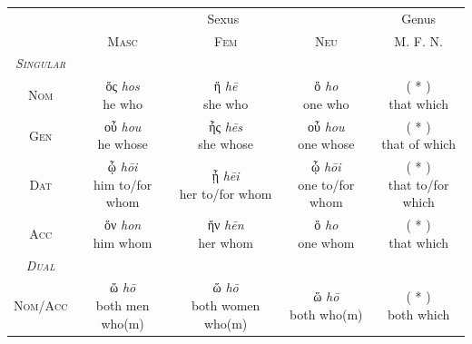 \documentclass[10pt,a4paper,notitlepage]{article}
\newcommand{\tsc}[1]{\textsc{#1}}
\newcommand*{\grc}[1]{\fontspec{Inter}#1\rmfamily}
\newcommand{\trc}[1]{\textit{\fontspec{Tinos}#1}}
\begin{document}
    \begin{table}[H]
        \begin{tabular}{c|ccc|c}
            & \multicolumn{3}{c|}{Sexus} & Genus \\
            & \tsc{Masc} & \tsc{Fem} & \tsc{Neu} & \tsc{M. F. N.} \\
            \hline
            \emph{\tsc{Singular}} & & & & \\
            \tsc{Nom} & \makecell{\grc{ὅς} \trc{hos} \\ \small he who} & \makecell{\grc{ἥ} \trc{hē} \\ \small she who } & \makecell{\grc{ὅ} \trc{ho} \\ \small one who} & \makecell{( * ) \\ \small that which} \\
            \tsc{Gen} & \makecell{\grc{οὗ} \trc{hou} \\ \small he whose} & \makecell{\grc{ἧς} \trc{hēs} \\ \small she whose} & \makecell{\grc{οὗ} \trc{hou} \\ \small one whose} & \makecell{( * ) \\ \small that of which} \\
            \tsc{Dat} & \makecell{\grc{ᾧ} \trc{hōi} \\ \small him to/for whom } & \makecell{\grc{ᾗ} \trc{hēi} \\ \small her to/for whom} & \makecell{\grc{ᾧ} \trc{hōi} \\ \small one to/for whom} & \makecell{( * ) \\ \small that to/for which} \\
            \tsc{Acc} & \makecell{\grc{ὅν} \trc{hon} \\ \small him whom} & \makecell{\grc{ἥν} \trc{hēn} \\ \small her whom} & \makecell{\grc{ὅ} \trc{ho} \\ \small one whom} & \makecell{( * ) \\ \small that which} \\
            \hline
            \emph{\tsc{Dual}} & & & & \\
            \tsc{Nom/Acc} & \makecell{\grc{ὥ} \trc{hō} \\ \small both men who(m)} & \makecell{\grc{ὥ} \trc{hō} \\ \small both women who(m)} & \makecell{\grc{ὥ} \trc{hō} \\ \small both who(m)} & \makecell{( * ) \\ \small both which} \\

\end{tabular}
\end{table}
\end{document}

